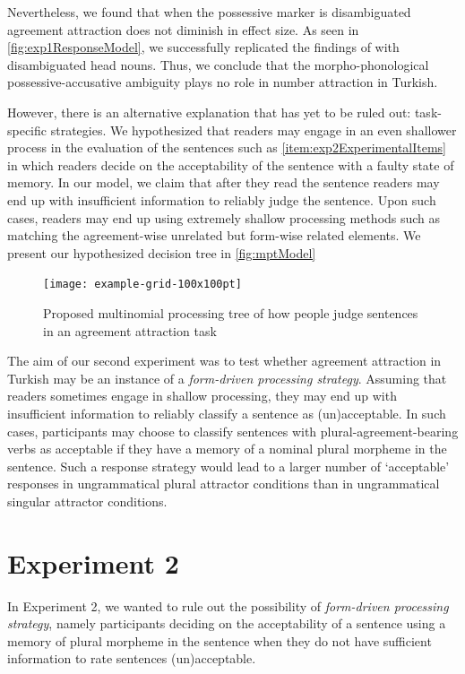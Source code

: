 \documentclass[a4paper,man,natbib]{apa6}\usepackage[]{graphicx}\usepackage[]{color}
\begin{document}
Nevertheless, we found that when the possessive marker is disambiguated agreement attraction does not diminish in effect size. As seen in \autoref{fig:exp1ResponseModel}, we successfully replicated the findings of \citet{LagoEtAl:2018} with disambiguated head nouns. Thus, we conclude that the morpho-phonological possessive-accusative ambiguity plays no role in number attraction in Turkish.


However, there is an alternative explanation that has yet to be ruled out: task-specific strategies. We hypothesized that readers may engage in an even shallower process in the evaluation of the sentences such as \ref{item:exp2ExperimentalItems} in which readers decide on the acceptability of the sentence with a faulty state of memory. In our model, we claim that after they read the sentence readers may end up with insufficient information to reliably judge the sentence. Upon such cases, readers may end up using extremely shallow processing methods such as matching the agreement-wise unrelated but form-wise related elements. %
We present our hypothesized decision tree in \autoref{fig:mptModel}

\begin{figure}[h]
    \centering
    \texttt{[image: example-grid-100x100pt]} 
    \caption{Proposed multinomial processing tree of how people judge sentences in an agreement attraction task}
    \label{fig:mptModel}
\end{figure}

The aim of our second experiment was to test whether agreement attraction in Turkish may be an instance of a \textit{form-driven processing strategy}. Assuming that readers sometimes engage in shallow processing, they may end up with insufficient information to reliably classify a sentence as (un)acceptable. In such cases, participants may choose to classify sentences with plural-agreement-bearing verbs as acceptable if they have a memory of a nominal plural morpheme in the sentence. Such a response strategy would lead to a larger number of ‘acceptable’ responses in ungrammatical plural attractor conditions than in ungrammatical singular attractor conditions. 



\section{Experiment 2} \label{sec:exp2}

In Experiment 2, we wanted to rule out the possibility of \textit{form-driven processing strategy}, namely participants deciding on the acceptability of a sentence using a memory of plural morpheme in the sentence when they do not have sufficient information to rate sentences (un)acceptable. 
 
\end{document}
